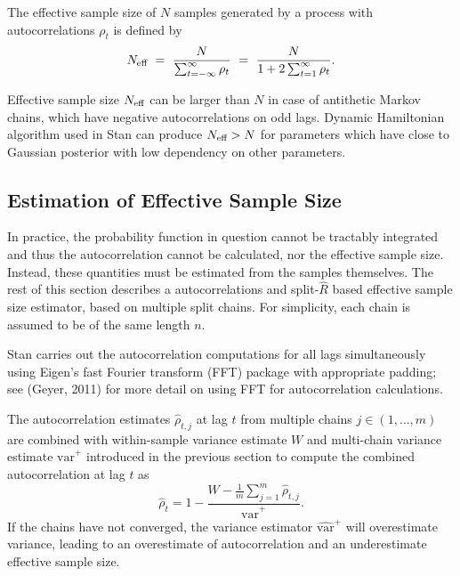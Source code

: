 \documentclass[11pt]{article}
\begin{document}
The effective sample size of $N$ samples generated by a process with
autocorrelations $\rho_t$ is defined by
\begin{equation}
N_{\mbox{\scriptsize eff}}
\ = \
\frac{N}{\sum_{t = -\infty}^{\infty} \rho_t}
\ = \
\frac{N}{1 + 2 \sum_{t = 1}^{\infty} \rho_t}.
\end{equation}

Effective sample size $N_{\mbox{\scriptsize eff}}$ can be larger than
$N$ in case of antithetic Markov chains, which have negative
autocorrelations on odd lags. Dynamic Hamiltonian algorithm used in Stan can
produce $N_{\mbox{\scriptsize eff}}>N$ for parameters which have close
to Gaussian posterior with low dependency on other parameters.

\subsection{Estimation of Effective Sample Size}

In practice, the probability function in question cannot be tractably
integrated and thus the autocorrelation cannot be calculated, nor the
effective sample size.  Instead, these quantities must be estimated
from the samples themselves.  The rest of this section describes a
autocorrelations and split-$\hat{R}$ based effective sample
size estimator, based on multiple split chains. For simplicity, each 
chain is assumed to be of the same length $n$.

Stan carries out the autocorrelation computations for all lags
simultaneously using Eigen's fast Fourier transform (FFT) package with
appropriate padding; see (Geyer, 2011) for more detail on using
FFT for autocorrelation calculations.

The autocorrelation estimates $\hat{\rho}_{t,j}$ at lag $t$ from
multiple chains $j \in (1,\ldots,m)$ are combined with within-sample 
variance estimate $W$ and multi-chain variance estimate
$\widehat{\mbox{var}}^{+}$ introduced in the previous section to 
compute the combined autocorrelation at lag $t$ as
\begin{equation}
\hat{\rho}_t
= 1 - \frac{\displaystyle W - \textstyle \frac{1}{m}\sum_{j=1}^m 
\hat{\rho}_{t,j}}{\widehat{\mbox{var}}^{+}}. \label{rhohat}
\end{equation}
If the chains have not converged, the variance estimator
$\widehat{\mbox{var}}^{+}$ will overestimate variance, leading to an
overestimate of autocorrelation and an underestimate effective sample
size.
\end{document}
